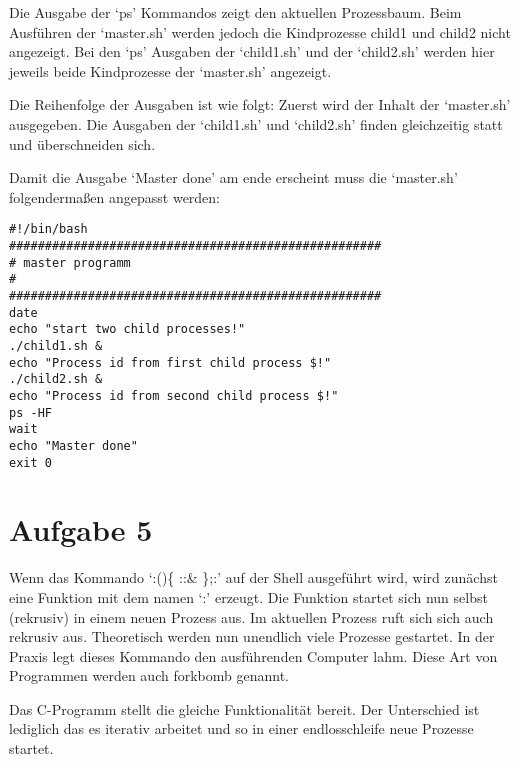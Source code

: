 \documentclass[a4paper]{article}
\begin{document}
Die Ausgabe der `ps' Kommandos zeigt den aktuellen Prozessbaum. Beim Ausführen
der `master.sh' werden jedoch die Kindprozesse child1 und child2 nicht angezeigt.
Bei den `ps' Ausgaben der `child1.sh' und der `child2.sh' werden hier jeweils
beide Kindprozesse der `master.sh' angezeigt.

Die Reihenfolge der Ausgaben ist wie folgt: Zuerst wird der Inhalt der `master.sh'
ausgegeben. Die Ausgaben der `child1.sh' und `child2.sh' finden gleichzeitig statt
und überschneiden sich.

Damit die Ausgabe `Master done' am ende erscheint muss die `master.sh' folgendermaßen
angepasst werden:

\begin{verbatim}
#!/bin/bash
####################################################
# master programm
#
####################################################
date
echo "start two child processes!"
./child1.sh &
echo "Process id from first child process $!"
./child2.sh &
echo "Process id from second child process $!"
ps -HF
wait
echo "Master done"
exit 0
\end{verbatim}

\section{Aufgabe 5}

Wenn das Kommando `:()\{ :\textbar:\& \};:' auf der Shell ausgeführt wird,
wird zunächst eine Funktion mit dem namen `:' erzeugt.
Die Funktion startet sich nun selbst (rekrusiv) in einem neuen Prozess aus. Im aktuellen
Prozess ruft sich sich auch rekrusiv aus.
Theoretisch werden nun unendlich viele Prozesse gestartet.
In der Praxis legt dieses Kommando den ausführenden
Computer lahm. Diese Art von Programmen werden auch forkbomb genannt.

Das C-Programm stellt die gleiche Funktionalität bereit. Der Unterschied ist lediglich das
es iterativ arbeitet und so in einer endlosschleife neue Prozesse startet.
\end{document}

